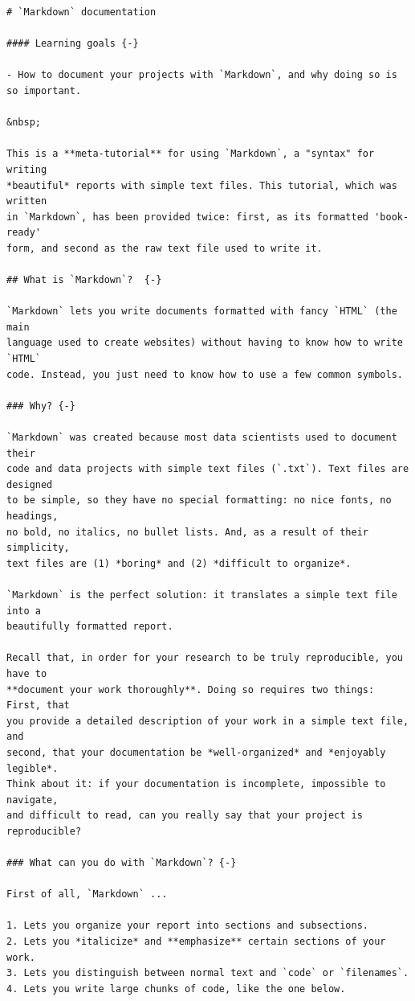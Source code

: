 \documentclass[
]{book}
\begin{document}
\begin{verbatim}
# `Markdown` documentation 

#### Learning goals {-}

- How to document your projects with `Markdown`, and why doing so is so important.

&nbsp;  

This is a **meta-tutorial** for using `Markdown`, a "syntax" for writing
*beautiful* reports with simple text files. This tutorial, which was written
in `Markdown`, has been provided twice: first, as its formatted 'book-ready' 
form, and second as the raw text file used to write it.  

## What is `Markdown`?  {-}  

`Markdown` lets you write documents formatted with fancy `HTML` (the main
language used to create websites) without having to know how to write `HTML`
code. Instead, you just need to know how to use a few common symbols. 

### Why? {-} 

`Markdown` was created because most data scientists used to document their
code and data projects with simple text files (`.txt`). Text files are designed
to be simple, so they have no special formatting: no nice fonts, no headings,
no bold, no italics, no bullet lists. And, as a result of their simplicity,
text files are (1) *boring* and (2) *difficult to organize*.  

`Markdown` is the perfect solution: it translates a simple text file into a
beautifully formatted report.  

Recall that, in order for your research to be truly reproducible, you have to
**document your work thoroughly**. Doing so requires two things: First, that
you provide a detailed description of your work in a simple text file, and
second, that your documentation be *well-organized* and *enjoyably legible*.
Think about it: if your documentation is incomplete, impossible to navigate,
and difficult to read, can you really say that your project is reproducible?

### What can you do with `Markdown`? {-}  

First of all, `Markdown` ...  

1. Lets you organize your report into sections and subsections.  
2. Lets you *italicize* and **emphasize** certain sections of your work. 
3. Lets you distinguish between normal text and `code` or `filenames`. 
4. Lets you write large chunks of code, like the one below. 


\end{verbatim}
\end{document}
